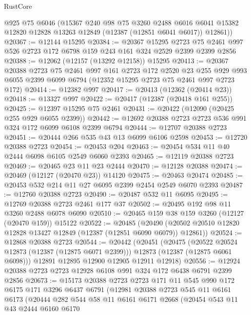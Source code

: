 \begin{lexlean}{RustCore}
\begin{coremodule}
      @925
      @75
      @6046
      (@15367
        @240
        @98
        @75
        @3260
        @2488
        @6016
        @6041
        @15382
        @12820
        @12828
        @13263
        @12849
        (@12387 (@12851 @6041 @6017))
        @12861))
@20367 := @12144 @15295
@20384 := @20367
    @15295
    @2723
    @75
    @2461
    @997
    @526
    @2723
    @172
    @6798
    @159
    @243
    @161
    @324
    @2529
    @2399
    @2399
    @2856
@20388 := @12062 (@12157 (@13292 @12158)) @15295
@20413 := @20367
    @20388
    @2723
    @75
    @2461
    @997
    @161
    @2723
    @172
    @2520
    @23
    @255
    @929
    @993
    @6055
    @2399
    @6099
    @6794
    (@12352 @15295 @2723 @75 @2461 @997 @2723 @172)
@20414 := @12382 @997
@20417 := @20413 (@12362 (@20414 @23))
@20418 := @13327 @997
@20422 := @20417 (@12387 (@20418 @161 @255))
@20425 := @12397 @15295 @75 @2461
@20431 := @20422 (@12090 (@20425 @255 @929 @6055 @2399))
@20442 := @12692 @20388 @2723 @2723 @536 @991 @324 @172 @6099 @6108 @2399 @6794
@20444 := @12707 @20388 @2723
@20451 := @20444 @266 @535 @43 @13 @6099 @6106 @2598
@20453 := @12720 @20388 @2723
@20454 := @20453 @204
@20463 := @20454 @534 @11 @40 @2444 @6098 @6105 @2549 @6060 @2393
@20465 := @12119 @20388 @2723
@20469 := @20465 @23 @11 @23 @2444
@20470 := @12128 @20388
@20474 := @20469 (@12127 (@20470 @23)) @14120
@20475 := @20463 @20474
@20485 := @20453 @532 @214 @11 @27 @6095 @2399 @2454 @2549 @6070 @2393
@20487 := @12760 @20388 @2723
@20490 := @20487 @532 @11 @6095
@20495 := @12769 @20388 @2723 @2461 @177 @37
@20502 := @20495 @192 @98 @11 @3260 @2488 @6078 @6090
@20510 := @20465 @159 @38 @159 @3260 (@12127 (@20470 @159)) @15122
@20522 := @20485
    (@20490 (@20502 @20510 @12820 @12828 @13427 @12849 (@12387 (@12851 @6090 @6079)) @12861))
@20524 := @12868 @20388 @2723
@20544 := @20442
    (@20451
      (@20475
        (@20522 @20524 @12873 (@12387 (@12875 @6071 @2399)))
        @12873
        (@12387 (@12875 @6061 @6098)))
      @12891
      @12895
      @12900
      @12905
      @12911
      @12918)
@20556 := @12924 @20388 @2723 @2723 @12928 @6108 @991 @324 @172 @6438 @6791 @2399 @2856
@20673 := @15173
    @20388
    @2723
    @2723
    @171
    @11
    @545
    @990
    @172
    @6175
    @171
    @3296
    @6437
    @6791
    (@12981
      @20388
      @2723
      @545
      @11
      @6161
      @6173
      (@20444
        @282
        @544
        @58
        @11
        @6161
        @6171
        @2668
        (@20454
          @543
          @11
          @43
          @2444
          @6160
          @6170

\end{coremodule}
\end{lexlean}
